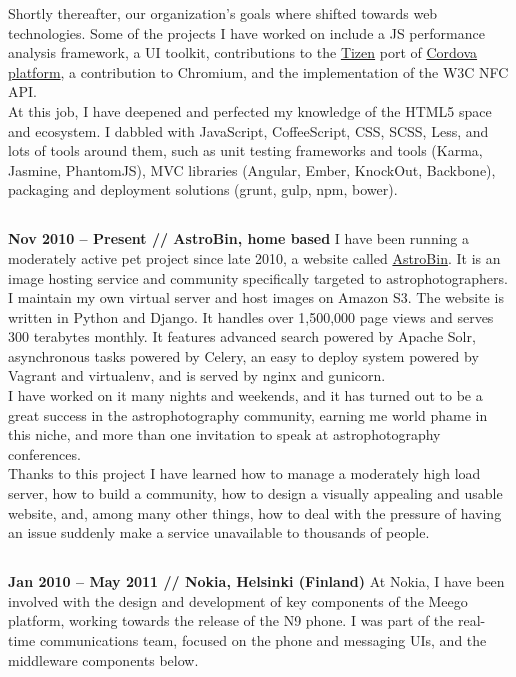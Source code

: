 \documentclass[10pt]{tccv}
\begin{document}
				Shortly thereafter, our organization's goals where shifted
				towards web technologies. Some of the projects I have worked on
				include a JS performance analysis framework, a UI toolkit,
				contributions to the \href{http://tizen.org}{Tizen} port of
				\href{http://cordova.apache.org/}{Cordova platform}, a
				contribution to Chromium, and the implementation of the W3C NFC
				API.\\
				
				At this job, I have deepened and perfected my knowledge of the
				HTML5 space and ecosystem. I dabbled with JavaScript,
				CoffeeScript, CSS, SCSS, Less, and lots of tools around them,
				such as unit testing frameworks and tools (Karma, Jasmine,
				PhantomJS), MVC libraries (Angular, Ember, KnockOut, Backbone),
				packaging and deployment solutions (grunt, gulp, npm, bower).

			\subsection{}
				\textbf{Nov 2010 -- Present // AstroBin, home based}
				I have been running a moderately active pet project since late
				2010, a website called \href{http://astrobin.com}{AstroBin}.
				It is an image hosting service and community specifically
				targeted to astrophotographers. I maintain my own virtual
				server and host images on Amazon S3. The website is written in
				Python and Django. It handles over 1,500,000 page views and
				serves 300 terabytes monthly. It features advanced search
				powered by Apache Solr, asynchronous tasks powered by Celery,
				an easy to deploy system powered by Vagrant and virtualenv, and
				is served by nginx and gunicorn.\\

				I have worked on it many nights and weekends, and it has turned
				out to be a great success in the astrophotography community,
				earning me world phame in this niche, and more than one
				invitation to speak at astrophotography conferences.\\

				Thanks to this project I have learned how to manage a
				moderately high load server, how to build a community, how to
				design a visually appealing and usable website, and, among many
				other things, how to deal with the pressure of having an issue
				suddenly make a service unavailable to thousands of people.

			\subsection{}
				\textbf{Jan 2010 -- May 2011 // Nokia, Helsinki (Finland)} At
				Nokia, I have been involved with the design and development of
				key components of the Meego platform, working towards the
				release of the N9 phone. I was part of the real-time
				communications team, focused on the phone and messaging UIs,
				and the middleware components below.\\
\end{document}
